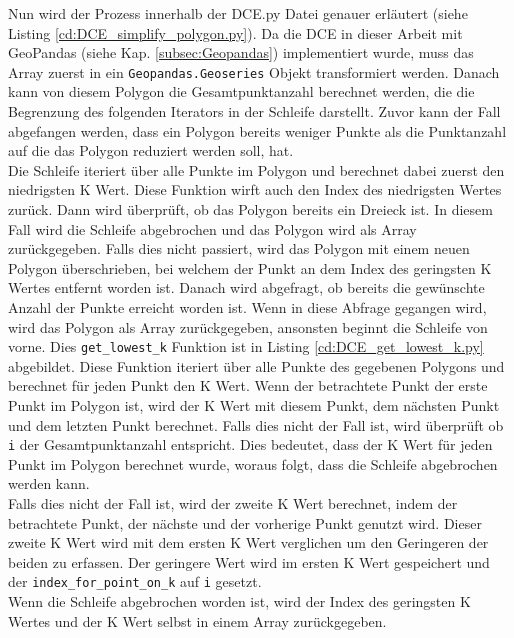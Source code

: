 {	Nun wird der Prozess innerhalb der DCE.py Datei genauer erläutert (siehe Listing \ref{cd:DCE_simplify_polygon.py}). Da die DCE in dieser Arbeit mit GeoPandas (siehe Kap. \ref{subsec:Geopandas}) implementiert wurde, muss das Array zuerst in ein \lstinline|Geopandas.Geoseries| Objekt transformiert werden. Danach kann von diesem Polygon die Gesamtpunktanzahl berechnet werden, die die Begrenzung des folgenden Iterators in der Schleife darstellt. Zuvor kann der Fall abgefangen werden, dass ein Polygon bereits weniger Punkte als die Punktanzahl auf die das Polygon reduziert werden soll, hat. \\
	
	Die Schleife iteriert über alle Punkte im Polygon und berechnet dabei zuerst den niedrigsten K Wert. Diese Funktion wirft auch den Index des niedrigsten Wertes zurück. Dann wird überprüft, ob das Polygon bereits ein Dreieck ist. In diesem Fall wird die Schleife abgebrochen und das Polygon wird als Array zurückgegeben. Falls dies nicht passiert, wird das Polygon mit einem neuen Polygon überschrieben, bei welchem der Punkt an dem Index des geringsten K Wertes entfernt worden ist. Danach wird abgefragt, ob bereits die gewünschte Anzahl der Punkte erreicht worden ist. Wenn in diese Abfrage gegangen wird, wird das Polygon als Array zurückgegeben, ansonsten beginnt die Schleife von vorne. 
	Dies \lstinline|get_lowest_k| Funktion ist in Listing \ref{cd:DCE_get_lowest_k.py} abgebildet. Diese Funktion iteriert über alle Punkte des gegebenen Polygons und berechnet für jeden Punkt den K Wert. Wenn der betrachtete Punkt der erste Punkt im Polygon ist, wird der K Wert mit diesem Punkt, dem nächsten Punkt und dem letzten Punkt berechnet. Falls dies nicht der Fall ist, wird überprüft ob \lstinline|i| der Gesamtpunktanzahl entspricht. Dies bedeutet, dass der K Wert für jeden Punkt im Polygon berechnet wurde, woraus folgt, dass die Schleife abgebrochen werden kann. \\
	Falls dies nicht der Fall ist, wird der zweite K Wert berechnet, indem der betrachtete Punkt, der nächste und der vorherige Punkt genutzt wird. Dieser zweite K Wert wird mit dem ersten K Wert verglichen um den Geringeren der beiden zu erfassen. Der geringere Wert wird im ersten K Wert gespeichert und der \lstinline|index_for_point_on_k| auf \lstinline|i| gesetzt. \\
	
	Wenn die Schleife abgebrochen worden ist, wird der Index des geringsten K Wertes und der K Wert selbst in einem Array zurückgegeben.\\

}
